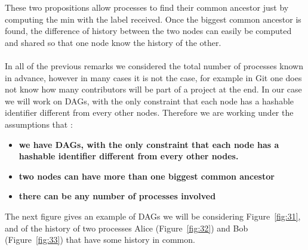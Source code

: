 These two propositions allow processes to find their common ancestor just by computing the min with the label received. Once the biggest common ancestor is found, the difference of history between the two nodes can easily be computed and shared so that one node know the history of the other.
\paragraph{} In all of the previous remarks we considered the total number of processes known in advance, however in many cases it is not the case, for example in Git one does not know how many contributors will be part of a project at the end. In our case we will work on DAGs, with the only constraint that each node has a hashable identifier different from every other nodes. Therefore we are working under the assumptions that : 
\begin{itemize}
 \item \textbf{we have DAGs, with the only constraint that each node has a hashable identifier different from every other nodes.}
 \item \textbf{two nodes can have more than one biggest common ancestor}
 \item \textbf{there can be any number of processes involved}
\end{itemize}
The next figure gives an example of DAGs we will be considering Figure~\ref{fig:31}, and of the history of two processes Alice (Figure~\ref{fig:32}) and 
Bob (Figure~\ref{fig:33}) that have some history in common.

